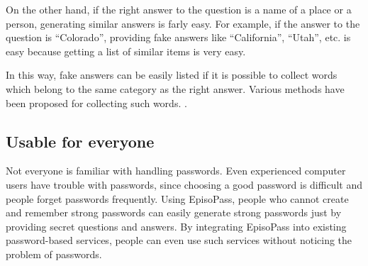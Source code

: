 \documentclass{article}
\begin{document}

On the other hand, if the right answer to the question is a name of a place or a person,
generating similar answers is farly easy.
For example, if the answer to the question is ``Colorado'',
providing fake answers like ``California'', ``Utah'', etc.
is easy because getting a list of similar items is very easy.

%
In this way, fake answers can be easily listed
if it is possible to collect words which belong to the same
category as the right answer.
%
Various methods have been proposed for collecting such words.
\cite{Huang:2012:LFC:2426725.2426728}%
\cite{BooWa}%
\cite{Wang:2007:LSE:1441428.1442086}%
\cite{大島裕明:2006-12-15}.%




\subsection{Usable for everyone}
  
Not everyone is familiar with handling passwords.
Even experienced computer users have trouble with passwords,
since choosing a good password is difficult and people forget passwords frequently.
Using EpisoPass, people who cannot create and remember strong passwords
can easily generate strong passwords just by providing secret
questions and answers.
By integrating EpisoPass into existing password-based services,
people can even use such services without noticing the problem of passwords.
\end{document}
